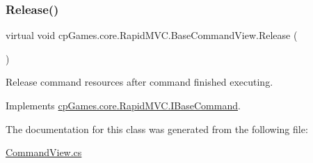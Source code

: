 \subsubsection{\texorpdfstring{Release()}{Release()}}
{\footnotesize\ttfamily virtual void cp\+Games.\+core.\+Rapid\+M\+V\+C.\+Base\+Command\+View.\+Release (\begin{DoxyParamCaption}{ }\end{DoxyParamCaption})\hspace{0.3cm}{\ttfamily [virtual]}}



Release command resources after command finished executing. 



Implements \mbox{\hyperlink{interfacecp_games_1_1core_1_1_rapid_m_v_c_1_1_i_base_command_aaf935c8b144d93bffac5b2e4fbe9881b}{cp\+Games.\+core.\+Rapid\+M\+V\+C.\+I\+Base\+Command}}.



The documentation for this class was generated from the following file\+:\begin{DoxyCompactItemize}
\item 
\mbox{\hyperlink{_command_view_8cs}{Command\+View.\+cs}}\end{DoxyCompactItemize}
